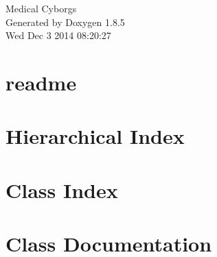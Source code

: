 \documentclass[twoside]{book}
\newcommand{\clearemptydoublepage}{%
  \newpage{\pagestyle{empty}\cleardoublepage}%
}
\begin{document}
\hypersetup{pageanchor=false}
\begin{titlepage}
\vspace*{7cm}
\begin{center}%
{\Large Medical Cyborgs }\\
\vspace*{1cm}
{\large Generated by Doxygen 1.8.5}\\
\vspace*{0.5cm}
{\small Wed Dec 3 2014 08:20:27}\\
\end{center}
\end{titlepage}
\clearemptydoublepage
\tableofcontents
\clearemptydoublepage
{}
\hypersetup{pageanchor=true}

\chapter{readme}
\label{md___users_douglas__documents_software__senior__project_ios__medical__cyborgs__medical__cyborgs_readme}
\hypertarget{md___users_douglas__documents_software__senior__project_ios__medical__cyborgs__medical__cyborgs_readme}{}

\chapter{Hierarchical Index}

\chapter{Class Index}

\chapter{Class Documentation}

































\newpage
{}
{}
\printindex
\end{document}

